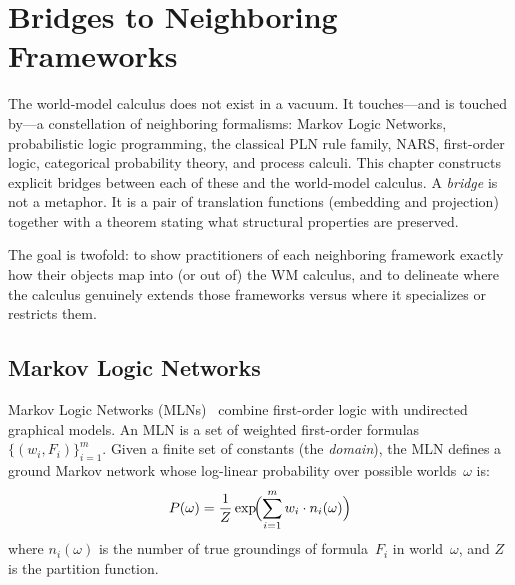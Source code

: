 \chapter{Bridges to Neighboring Frameworks}
\label{ch:bridges}

The world-model calculus does not exist in a vacuum.  It touches---and is
touched by---a constellation of neighboring formalisms: Markov Logic
Networks, probabilistic logic programming, the classical PLN rule family,
NARS, first-order logic, categorical probability theory, and process
calculi.  This chapter constructs explicit bridges between each of these
and the world-model calculus.  A \emph{bridge} is not a metaphor.  It is a
pair of translation functions (embedding and projection) together with a
theorem stating what structural properties are preserved.

The goal is twofold: to show practitioners of each neighboring framework
exactly how their objects map into (or out of) the WM calculus, and to
delineate where the calculus genuinely extends those frameworks versus
where it specializes or restricts them.



\section{Markov Logic Networks}
\label{sec:bridge-mln}

Markov Logic Networks (MLNs)~\cite{richardson2006markov} combine
first-order logic with undirected graphical models.  An MLN is a set of
weighted first-order formulas $\{(w_i, F_i)\}_{i=1}^m$.  Given a finite
set of constants (the \emph{domain}), the MLN defines a ground Markov
network whose log-linear probability over possible worlds~$\omega$ is:
\[
  P(\omega) = \frac{1}{Z} \exp\!\Bigl(\sum_{i=1}^m w_i \cdot n_i(\omega)\Bigr)
\]
where $n_i(\omega)$ is the number of true groundings of formula~$F_i$ in
world~$\omega$, and $Z$ is the partition function.

